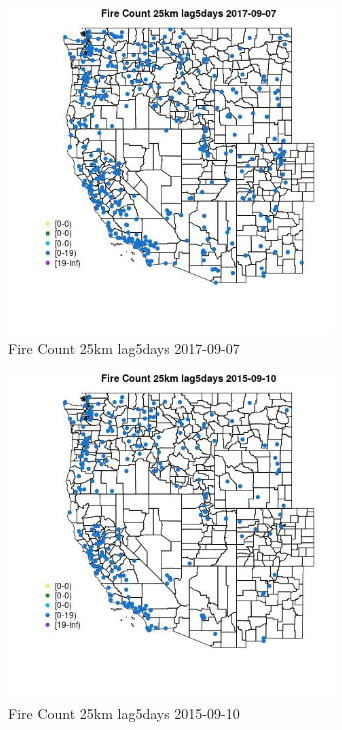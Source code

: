 \begin{figure} 
\centering  
\includegraphics[width=0.77\textwidth]{Code_Outputs/Report_ML_input_PM25_Step4_part_e_de_duplicated_aves_compiled_2019-05-20wNAs_MapObsFire_Count_25km_lag5days2017-09-07.jpg} 
\caption{\label{fig:Report_ML_input_PM25_Step4_part_e_de_duplicated_aves_compiled_2019-05-20wNAsMapObsFire_Count_25km_lag5days2017-09-07}Fire Count 25km lag5days 2017-09-07} 
\end{figure} 
 

\begin{figure} 
\centering  
\includegraphics[width=0.77\textwidth]{Code_Outputs/Report_ML_input_PM25_Step4_part_e_de_duplicated_aves_compiled_2019-05-20wNAs_MapObsFire_Count_25km_lag5days2015-09-10.jpg} 
\caption{\label{fig:Report_ML_input_PM25_Step4_part_e_de_duplicated_aves_compiled_2019-05-20wNAsMapObsFire_Count_25km_lag5days2015-09-10}Fire Count 25km lag5days 2015-09-10} 
\end{figure} 
 

